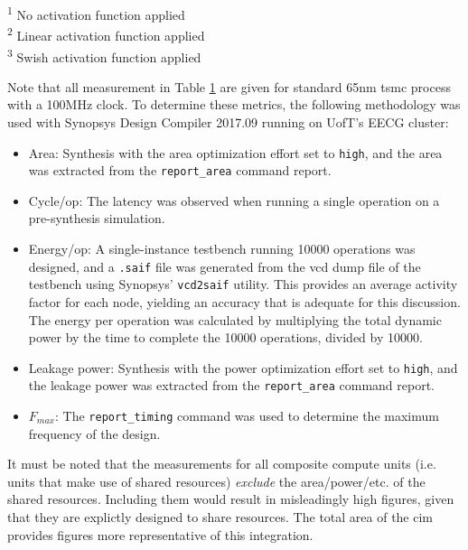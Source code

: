 \documentclass[12pt, hidelinks]{article}
\begin{document}
\begin{table}[ht]
\begin{tabular}{@{} p{2.5cm}ccccc @{}}
        \hline
    \end{tabular}
    \begin{minipage}{\textwidth}
        \footnotesize
        \noindent\hspace*{1cm}\textsuperscript{1} No activation function applied\\
        \noindent\hspace*{1cm}\textsuperscript{2} Linear activation function applied\\
        \noindent\hspace*{1cm}\textsuperscript{3} Swish activation function applied
    \end{minipage}
    \label{tab:compute_modules}
\end{table}

Note that all measurement in Table \ref{tab:compute_modules} are given for standard 65nm \ac{tsmc} process with a 100MHz clock.
To determine these metrics, the following methodology was used with Synopsys Design Compiler 2017.09 running on UofT's EECG cluster:
\begin{itemize}
    \item Area: Synthesis with the area optimization effort set to \texttt{high}, and the area was extracted from the \texttt{report\_area} command report.
    \item Cycle/op: The latency was observed when running a single operation on a pre-synthesis simulation.
    \item Energy/op: A single-instance testbench running 10000 operations was designed, and a \texttt{.saif} file was generated from the \ac{vcd} dump file of the testbench
    using Synopsys' \texttt{vcd2saif} utility. This provides an average activity factor for each node, yielding an accuracy that is adequate for this discussion. The energy
    per operation was calculated by multiplying the total dynamic power by the time to complete the 10000 operations, divided by 10000.
    \item Leakage power: Synthesis with the power optimization effort set to \texttt{high}, and the leakage power was extracted from the \texttt{report\_area} command report.
    \item $F_{max}$: The \texttt{report\_timing} command was used to determine the maximum frequency of the design.
\end{itemize}

It must be noted that the measurements for all composite compute units (i.e. units that make use of shared resources) \textit{exclude} the area/power/etc. of the shared resources.
Including them would result in misleadingly high figures, given that they are explictly designed to share resources. The total area of the \ac{cim} provides figures more representative
of this integration.
\end{document}
